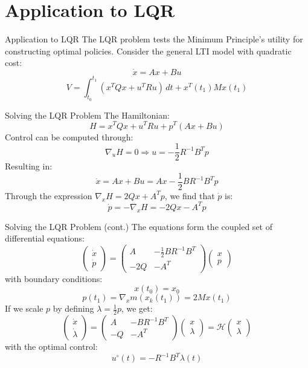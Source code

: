 \documentclass[10pt]{beamer}
\begin{document}
\section{Application to LQR}
  
\begin{frame}[fragile]{Application to LQR}
  The LQR problem tests the Minimum Principle's utility for constructing optimal policies. Consider the general LTI model with quadratic cost:
  \[
  \dot{x} = Ax + Bu
  \]
  \[
  V = \int_{t_0}^{t_1} (x^T Q x + u^T R u) \, dt + x^T(t_1) M x(t_1)
  \]
\end{frame}

\begin{frame}[fragile]{Solving the LQR Problem}
  The Hamiltonian:
  \[
  H = x^T Q x + u^T R u + p^T (Ax + Bu)
  \]
  Control can be computed through:
  \[
  \nabla_u H = 0 \Rightarrow u = -\frac{1}{2} R^{-1} B^T p
  \]
  Resulting in:
  \[
  \dot{x} = Ax + Bu = Ax - \frac{1}{2} BR^{-1} B^T p
  \]
  Through the expression \( \nabla_x H = 2Qx + A^T p \), we find that \( \dot{p} \) is:
  \[
  \dot{p} = -\nabla_x H = -2Q x - A^T p
  \]
\end{frame}
  
\begin{frame}[fragile]{Solving the LQR Problem (cont.)}
  The equations form the coupled set of differential equations:
  \[
  \begin{pmatrix}
  \dot{x} \\
  \dot{p}
  \end{pmatrix}
  =
  \begin{pmatrix}
  A & -\frac{1}{2} BR^{-1} B^T \\
  -2Q & -A^T
  \end{pmatrix}
  \begin{pmatrix}
  x \\
  p
  \end{pmatrix}
  \]
  with boundary conditions:
  \[
  x(t_0) = x_0
  \]
  \[
  p(t_1) = \nabla_x m(x_k(t_1)) = 2Mx(t_1)
  \]
  If we scale \( p \) by defining \( \lambda = \frac{1}{2} p \), we get:
  \[
  \begin{pmatrix}
  \dot{x} \\
  \dot{\lambda}
  \end{pmatrix}
  =
  \begin{pmatrix}
  A & -BR^{-1} B^T \\
  -Q & -A^T
  \end{pmatrix}
  \begin{pmatrix}
  x \\
  \lambda
  \end{pmatrix} = \mathcal{H}   \begin{pmatrix}
    x \\
    \lambda
    \end{pmatrix}
  \]
  with the optimal control:
  \[
  u^\circ(t) = -R^{-1} B^T \lambda(t)
  \]
\end{frame}
\end{document}
